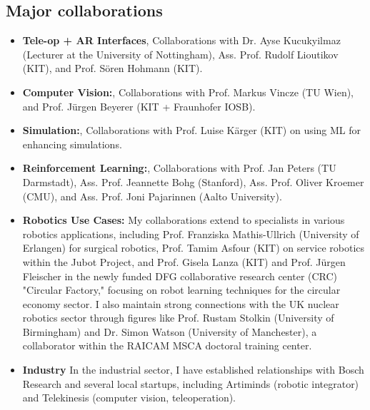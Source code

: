 \subsection{Major collaborations}
\begin{itemize}
\setlength\itemsep{1em}
\item {\textbf{Tele-op + AR Interfaces}, Collaborations with Dr. Ayse Kucukyilmaz (Lecturer at the University of Nottingham), Ass. Prof. Rudolf Lioutikov (KIT), and Prof. Sören Hohmann (KIT).}
\item {\textbf{Computer Vision:}, Collaborations with Prof. Markus Vincze (TU Wien), and Prof. Jürgen Beyerer (KIT + Fraunhofer IOSB).}
\item {\textbf{Simulation:}, Collaborations with Prof. Luise Kärger (KIT) on using ML for enhancing simulations.}
\item {\textbf{Reinforcement Learning:},
Collaborations with Prof. Jan Peters (TU Darmstadt), Ass. Prof. Jeannette Bohg (Stanford), Ass. Prof. Oliver Kroemer (CMU), and Ass. Prof. Joni Pajarinnen (Aalto University).}
\item{\textbf{Robotics Use Cases:}} My collaborations extend to specialists in various robotics applications, including Prof. Franziska Mathis-Ullrich (University of Erlangen) for surgical robotics, Prof. Tamim Asfour (KIT) on service robotics within the Jubot Project, and Prof. Gisela Lanza (KIT) and Prof. Jürgen Fleischer in the newly funded DFG collaborative research center (CRC) "Circular Factory," focusing on robot learning techniques for the circular economy sector. I also maintain strong connections with the UK nuclear robotics sector through figures like Prof. Rustam Stolkin (University of Birmingham) and Dr. Simon Watson (University of Manchester), a collaborator within the RAICAM MSCA doctoral training center.
\item{\textbf{Industry}}{
In the industrial sector, I have established relationships with Bosch Research and several local startups, including Artiminds (robotic integrator) and Telekinesis (computer vision, teleoperation).}
\end{itemize}